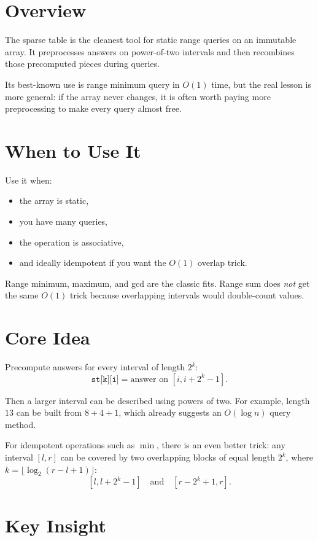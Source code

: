\section*{Overview}

The sparse table is the cleanest tool for static range queries on an immutable array. It preprocesses answers on
power-of-two intervals and then recombines those precomputed pieces during queries.

Its best-known use is range minimum query in \(O(1)\) time, but the real lesson is more general: if the array never
changes, it is often worth paying more preprocessing to make every query almost free.

\section*{When to Use It}

Use it when:

\begin{itemize}
  \item the array is static,
  \item you have many queries,
  \item the operation is associative,
  \item and ideally idempotent if you want the \(O(1)\) overlap trick.
\end{itemize}

Range minimum, maximum, and gcd are the classic fits. Range sum does \emph{not} get the same \(O(1)\) trick because
overlapping intervals would double-count values.

\section*{Core Idea}

Precompute answers for every interval of length \(2^k\):
\[
\texttt{st[k][i]} = \text{answer on } [i, i + 2^k - 1].
\]

Then a larger interval can be described using powers of two. For example, length \(13\) can be built from
\(8 + 4 + 1\), which already suggests an \(O(\log n)\) query method.

For idempotent operations such as \(\min\), there is an even better trick: any interval \([l, r]\) can be covered by
two overlapping blocks of equal length \(2^k\), where \(k = \lfloor \log_2(r - l + 1) \rfloor\):
\[
[l, l + 2^k - 1]
\quad\text{and}\quad
[r - 2^k + 1, r].
\]

\section*{Key Insight}

